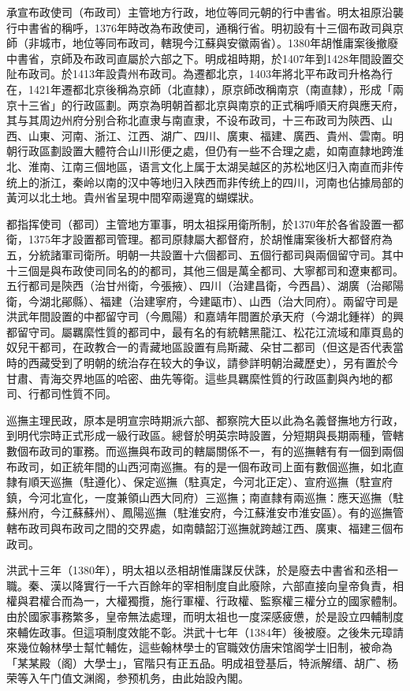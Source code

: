 承宣布政使司（布政司）主管地方行政，地位等同元朝的行中書省。明太祖原沿襲行中書省的稱呼，1376年時改為布政使司，通稱行省。明初設有十三個布政司與京師（非城市，地位等同布政司，轄現今江蘇與安徽兩省）。1380年胡惟庸案後撤廢中書省，京師及布政司直屬於六部之下。明成祖時期，於1407年到1428年間設置交阯布政司。於1413年設貴州布政司。為遷都北京，1403年將北平布政司升格為行在，1421年遷都北京後稱為京師（北直隸），原京師改稱南京（南直隸），形成「兩京十三省」的行政區劃。两京為明朝首都北京與南京的正式稱呼順天府與應天府，其与其周边州府分别合称北直隶与南直隶，不设布政司，十三布政司为陝西、山西、山東、河南、浙江、江西、湖广、四川、廣東、福建、廣西、貴州、雲南。明朝行政區劃設置大體符合山川形便之處，但仍有一些不合理之處，如南直隸地跨淮北、淮南、江南三個地區，语言文化上属于太湖吴越区的苏松地区归入南直而非传统上的浙江，秦岭以南的汉中等地归入陕西而非传统上的四川，河南也佔據局部的黃河以北土地。貴州省呈現中間窄兩邊寬的蝴蝶狀。

都指挥使司（都司）主管地方軍事，明太祖採用衛所制，於1370年於各省設置一都衛，1375年才設置都司管理。都司原隸屬大都督府，於胡惟庸案後析大都督府為五，分統諸軍司衛所。明朝一共設置十六個都司、五個行都司與兩個留守司。其中十三個是與布政使司同名的的都司，其他三個是萬全都司、大寧都司和遼東都司。五行都司是陝西（治甘州衛，今張掖）、四川（治建昌衛，今西昌）、湖廣（治鄖陽衛，今湖北鄖縣）、福建（治建寧府，今建甌市）、山西（治大同府）。兩留守司是洪武年間設置的中都留守司（今鳳陽）和嘉靖年間置於承天府（今湖北鍾祥）的興都留守司。屬羈縻性質的都司中，最有名的有統轄黑龍江、松花江流域和庫頁島的奴兒干都司，在政教合一的青藏地區設置有烏斯藏、朵甘二都司（但这是否代表當時的西藏受到了明朝的统治存在较大的争议，請參詳明朝治藏歷史），另有置於今甘肅、青海交界地區的哈密、曲先等衛。這些具羈縻性質的行政區劃與內地的都司、行都司性質不同。

巡撫主理民政，原本是明宣宗時期派六部、都察院大臣以此為名義督撫地方行政，到明代宗時正式形成一級行政區。總督於明英宗時設置，分短期與長期兩種，管轄數個布政司的軍務。而巡撫與布政司的轄屬關係不一，有的巡撫轄有有一個到兩個布政司，如正統年間的山西河南巡撫。有的是一個布政司上面有數個巡撫，如北直隸有順天巡撫（駐遵化）、保定巡撫（駐真定，今河北正定）、宣府巡撫（駐宣府鎮，今河北宣化，一度兼領山西大同府）三巡撫；南直隸有兩巡撫：應天巡撫（駐蘇州府，今江蘇蘇州）、鳳陽巡撫（駐淮安府，今江蘇淮安市淮安區）。有的巡撫管轄布政司與布政司之間的交界處，如南贛韶汀巡撫就跨越江西、廣東、福建三個布政司。

洪武十三年（1380年），明太祖以丞相胡惟庸謀反伏誅，於是廢去中書省和丞相一職。秦、漢以降實行一千六百餘年的宰相制度自此廢除，六部直接向皇帝負責，相權與君權合而為一，大權獨攬，施行軍權、行政權、監察權三權分立的國家體制。由於國家事務繁多，皇帝無法處理，而明太祖也一度深感疲憊，於是設立四輔制度來輔佐政事。但這項制度效能不彰。洪武十七年（1384年）後被廢。之後朱元璋請來幾位翰林學士幫忙輔佐，這些翰林學士的官職效仿唐宋馆阁学士旧制，被命為「某某殿（阁）大學士」，官階只有正五品。明成祖登基后，特派解缙、胡广、杨荣等入午门值文渊阁，参预机务，由此始設內閣。

